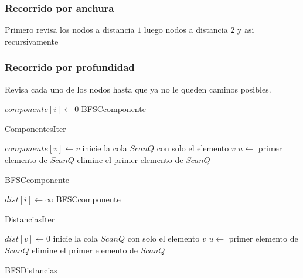 \documentclass{report}
\begin{document}
      \subsubsection{Recorrido por anchura}

      Primero revisa los nodos a distancia $1$ luego nodos a distancia $2$ y asi recursivamente

      \subsubsection{Recorrido por profundidad}

      Revisa cada uno de los nodos hasta que ya no le queden caminos posibles.

      \begin{algorithm}
	 {
	  $componente\left[ i \right] \leftarrow 0$ \;
	}  {
	   {
	    BFSCcomponente
	  }
	}
	\caption{ComponentesIter}
      \end{algorithm}

      \begin{algorithm}
	$componente\left[ v \right] \leftarrow v$ \;
	inicie la cola $ScanQ$ con solo el elemento $v$ \;
	 {
	  $u\leftarrow$ primer elemento de $ScanQ$ \;
	  elimine el primer elemento de $ScanQ$ \;
	   {
	  }
	}
	\caption{BFSCcomponente}
      \end{algorithm}


      \begin{algorithm}
	 {
	$dist\left[ i \right] \leftarrow \infty$ \;}
	    BFSCcomponente
	\caption{DistanciasIter}
      \end{algorithm}

      \begin{algorithm}
	$dist\left[ v \right] \leftarrow 0$ \;
	inicie la cola $ScanQ$ con solo el elemento $v$ \;
	 {
	  $u\leftarrow$ primer elemento de $ScanQ$ \;
	  elimine el primer elemento de $ScanQ$ \;
	   {
	  }
	}
	\caption{BFSDistancias}
      \end{algorithm}
\end{document}
